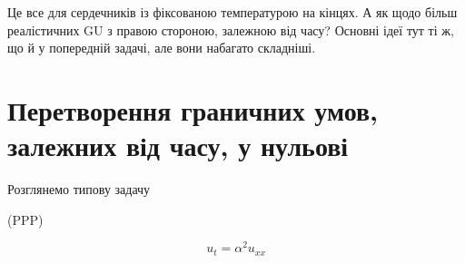 \documentclass[
  ukrainian,
]{article}
\begin{document}
Це все для сердечників із фіксованою температурою на кінцях. А як щодо
більш реалістичних GU з правою стороною, залежною від часу? Основні ідеї
тут ті ж, що й у попередній задачі, але вони набагато складніші.

\section{Перетворення граничних умов, залежних від часу, у
нульові}\label{ux43fux435ux440ux435ux442ux432ux43eux440ux435ux43dux43dux44f-ux433ux440ux430ux43dux438ux447ux43dux438ux445-ux443ux43cux43eux432-ux437ux430ux43bux435ux436ux43dux438ux445-ux432ux456ux434-ux447ux430ux441ux443-ux443-ux43dux443ux43bux44cux43eux432ux456}

Розглянемо типову задачу

(PPP)

\[
u_t = \alpha^2 u_{xx}
\]
\end{document}
